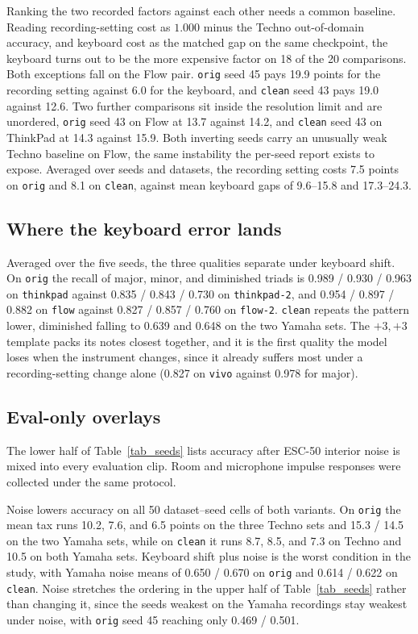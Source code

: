 \documentclass[pdflatex,sn-mathphys-num,iicol]{sn-jnl}
\begin{document}
Ranking the two recorded factors against each other needs a common baseline. Reading recording-setting cost as $1.000$ minus the Techno out-of-domain accuracy, and keyboard cost as the matched gap on the same checkpoint, the keyboard turns out to be the more expensive factor on 18 of the 20 comparisons. Both exceptions fall on the Flow pair. \texttt{orig} seed 45 pays 19.9 points for the recording setting against 6.0 for the keyboard, and \texttt{clean} seed 43 pays 19.0 against 12.6. Two further comparisons sit inside the resolution limit and are unordered, \texttt{orig} seed 43 on Flow at 13.7 against 14.2, and \texttt{clean} seed 43 on ThinkPad at 14.3 against 15.9. Both inverting seeds carry an unusually weak Techno baseline on Flow, the same instability the per-seed report exists to expose. Averaged over seeds and datasets, the recording setting costs 7.5 points on \texttt{orig} and 8.1 on \texttt{clean}, against mean keyboard gaps of 9.6--15.8 and 17.3--24.3.

\subsection{Where the keyboard error lands}\label{subsec_res_quality}

Averaged over the five seeds, the three qualities separate under keyboard shift. On \texttt{orig} the recall of major, minor, and diminished triads is 0.989 / 0.930 / 0.963 on \texttt{thinkpad} against 0.835 / 0.843 / 0.730 on \texttt{thinkpad-2}, and 0.954 / 0.897 / 0.882 on \texttt{flow} against 0.827 / 0.857 / 0.760 on \texttt{flow-2}. \texttt{clean} repeats the pattern lower, diminished falling to 0.639 and 0.648 on the two Yamaha sets. The $+3,+3$ template packs its notes closest together, and it is the first quality the model loses when the instrument changes, since it already suffers most under a recording-setting change alone (0.827 on \texttt{vivo} against 0.978 for major).

\subsection{Eval-only overlays}\label{subsec_res_noise}

The lower half of Table~\ref{tab_seeds} lists accuracy after ESC-50 interior noise is mixed into every evaluation clip. Room and microphone impulse responses were collected under the same protocol.

Noise lowers accuracy on all 50 dataset--seed cells of both variants. On \texttt{orig} the mean tax runs 10.2, 7.6, and 6.5 points on the three Techno sets and 15.3 / 14.5 on the two Yamaha sets, while on \texttt{clean} it runs 8.7, 8.5, and 7.3 on Techno and 10.5 on both Yamaha sets. Keyboard shift plus noise is the worst condition in the study, with Yamaha noise means of 0.650 / 0.670 on \texttt{orig} and 0.614 / 0.622 on \texttt{clean}. Noise stretches the ordering in the upper half of Table~\ref{tab_seeds} rather than changing it, since the seeds weakest on the Yamaha recordings stay weakest under noise, with \texttt{orig} seed 45 reaching only 0.469 / 0.501.
\end{document}
